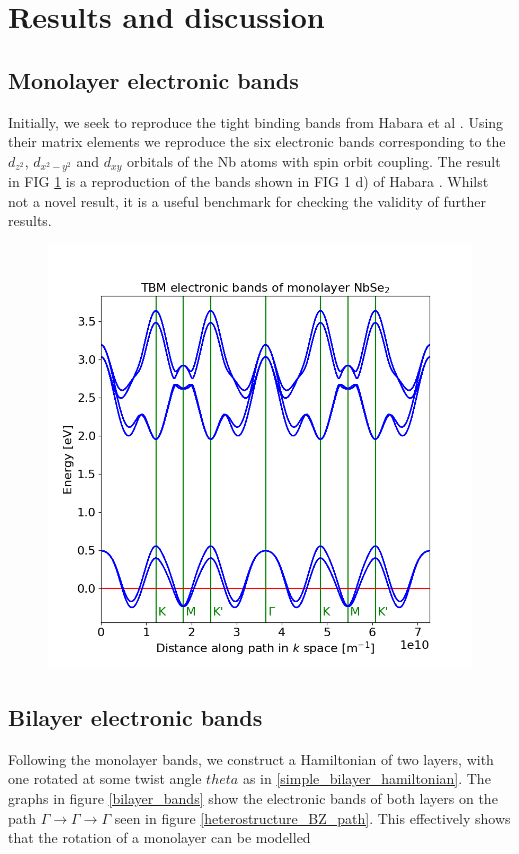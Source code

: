 \documentclass[12pt]{report} %
\begin{document}
\section*{Results and discussion}

\subsection*{Monolayer electronic bands}
Initially, we seek to reproduce the tight binding bands from Habara et al \cite{Habara2021}. Using their matrix elements we reproduce the six electronic bands corresponding to the $d_{z^2}$, $d_{x^2 - y^2}$ and $d_{xy}$ orbitals of the Nb atoms with spin orbit coupling. The result in FIG \ref{monolayer_bands} is a reproduction of the bands shown in FIG 1 d) of Habara \cite{Habara2021}. Whilst not a novel result, it is a useful benchmark for checking the validity of further results.

\begin{figure}[t!]
\centering
  \includegraphics[width=0.75\columnwidth]{monolayer_bands.png}
  \caption{
  }
  \label{monolayer_bands}
\end{figure}

\subsection*{Bilayer electronic bands}
Following the monolayer bands, we construct a Hamiltonian of two layers, with one rotated at some twist angle $theta$ as in \ref{simple_bilayer_hamiltonian}. The graphs in figure \ref{bilayer_bands} show the electronic bands of both layers on the path $\Gamma \rightarrow \Gamma \rightarrow \Gamma$ seen in figure \ref{heterostructure_BZ_path}. This effectively shows that the rotation of a monolayer can be modelled
\end{document}

